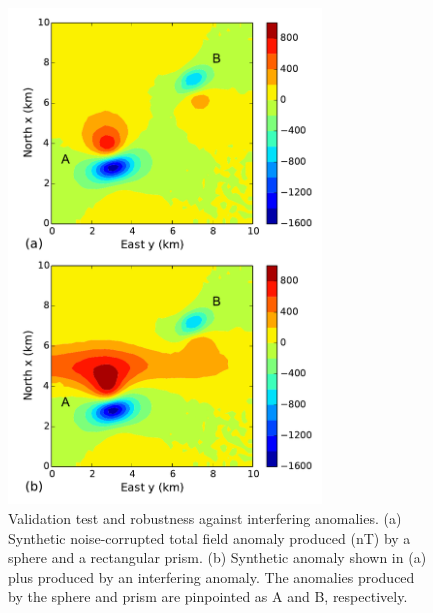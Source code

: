 \documentclass[journal abbreviation, npg]{copernicus}
\begin{document}
\begin{figure}[t]
\vspace*{2mm}
\begin{center}
\includegraphics[width=8.3cm]{Figures/Fig3.pdf}
\end{center}
\caption{Validation test and robustness against interfering anomalies. (a) Synthetic noise-corrupted total field anomaly produced (nT) by a sphere and a rectangular prism. (b)  Synthetic anomaly shown in (a) plus produced by an interfering anomaly. The anomalies produced by the sphere and prism are pinpointed  as A and B, respectively.} 
\label{fig:synt1-data}
\end{figure}
\end{document}
